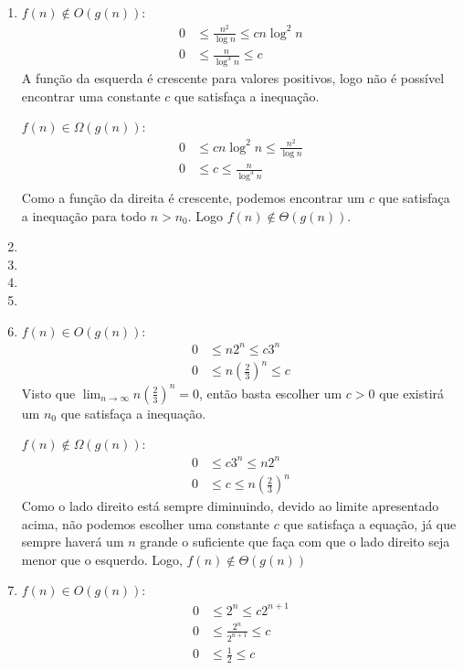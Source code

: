 \documentclass{article}
\begin{document}
\begin{enumerate}
\begin{enumerate}
		\item $f(n) \notin O(g(n))$:
		\begin{align*}
			0 &\le \frac{n^2}{\log n} \le c n \log^2 n \\
			0 &\le \frac{n}{\log^3 n} \le c
		\end{align*}
		A função  da esquerda é crescente para valores positivos, logo não é
		possível encontrar uma constante $c$ que satisfaça a inequação.

		$f(n) \in \Omega(g(n))$:
		\begin{align*}
			0 &\le c n \log^2 n \le \frac{n^2}{\log n} \\
			0 &\le c \le \frac{n}{\log^3 n} \\
		\end{align*}
		Como a função da direita é crescente, podemos encontrar um $c$ que
		satisfaça a inequação para todo $n > n_0$. Logo $f(n) \notin
		\Theta(g(n))$.

		\item

		\item

		\item

		\item

		\item $f(n) \in O(g(n))$:
		\begin{align*}
			0 &\le n2^n \le c 3^n \\
			0 &\le n\left(\frac{2}{3}\right)^n \le c
		\end{align*}
		Visto que $\lim_{n\to\infty}n\left(\frac{2}{3}\right)^n = 0$, então
		basta escolher um $c > 0$ que existirá um $n_0$ que satisfaça a
		inequação.

		$f(n) \notin \Omega(g(n))$:
		\begin{align*}
			0 &\le c 3^n \le n 2^n \\
			0 &\le c \le n \left(\frac{2}{3}\right)^n
		\end{align*}
		Como o lado direito está sempre diminuindo, devido ao limite
		apresentado acima, não podemos escolher uma constante $c$ que satisfaça
		a equação, já que sempre haverá um $n$ grande o suficiente que faça com
		que o lado direito seja menor que o esquerdo. Logo, $f(n) \notin
		\Theta(g(n))$

		\item $f(n) \in O(g(n))$:
		\begin{align*}
			0 &\le 2^n \le c 2^{n+1} \\
			0 &\le \frac{2^n}{2^{n+1}} \le c \\
			0 &\le \frac{1}{2} \le c
		\end{align*}


\end{enumerate}
\end{enumerate}
\end{document}
